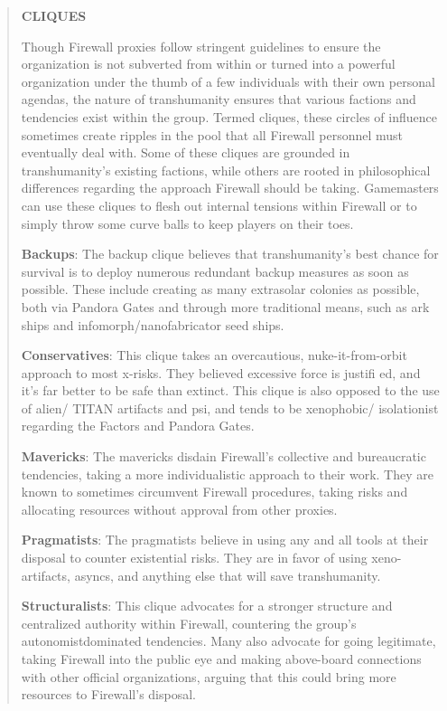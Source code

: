 \begin{quotation} \begin{large} \textbf{CLIQUES} \end{large} 

Though Firewall proxies follow stringent guidelines to ensure the organization is not subverted from within or turned into a powerful organization under the thumb of a few individuals with their own personal agendas, the nature of transhumanity ensures that various factions and tendencies exist within the group. Termed cliques, these circles of influence sometimes create ripples in the pool that all Firewall personnel must eventually deal with. Some of these cliques are grounded in transhumanity’s existing factions, while others are rooted in philosophical differences regarding the approach Firewall should be taking. Gamemasters can use these cliques to flesh out internal tensions within Firewall or to simply throw some curve balls to keep players on their toes. 

\textbf{Backups}: The backup clique believes that transhumanity’s best chance for survival is to deploy numerous redundant backup measures as soon as possible. These include creating as many extrasolar colonies as possible, both via Pandora Gates and through more traditional means, such as ark ships and infomorph/nanofabricator seed ships. 

\textbf{Conservatives}: This clique takes an overcautious, nuke-it-from-orbit approach to most x-risks. They believed excessive force is justifi ed, and it’s far better to be safe than extinct. This clique is also opposed to the use of alien/ TITAN artifacts and psi, and tends to be xenophobic/ isolationist regarding the Factors and Pandora Gates. 

\textbf{Mavericks}: The mavericks disdain Firewall’s collective and bureaucratic tendencies, taking a more individualistic approach to their work. They are known to sometimes circumvent Firewall procedures, taking risks and allocating resources without approval from other proxies. 

\textbf{Pragmatists}: The pragmatists believe in using any and all tools at their disposal to counter existential risks. They are in favor of using xeno-artifacts, asyncs, and anything else that will save transhumanity. 

\textbf{Structuralists}: This clique advocates for a stronger structure and centralized authority within Firewall, countering the group’s autonomistdominated tendencies. Many also advocate for going legitimate, taking Firewall into the public eye and making above-board connections with other official organizations, arguing that this could bring more resources to Firewall’s disposal. \end{quotation} 







